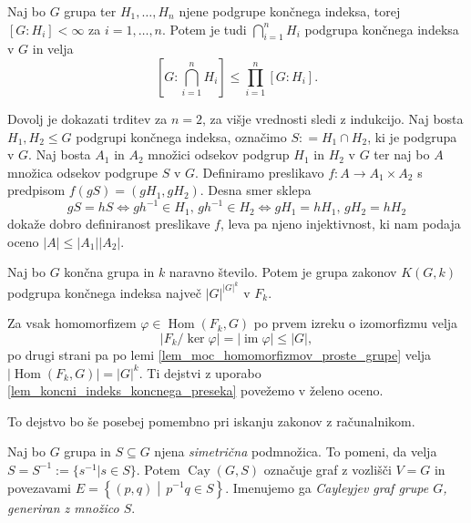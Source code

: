 \begin{lema}\label{lem_koncni_indeks_koncnega_preseka}
Naj bo $G$ grupa ter $H_1, \ldots, H_n$ njene podgrupe končnega indeksa, torej $[G: H_i] < \infty$ za $i = 1, \ldots, n$. Potem je tudi $\bigcap_{i = 1}^{n} H_i$ podgrupa končnega indeksa v $G$ in velja
\begin{equation*}
\left[ G: \bigcap_{i = 1}^{n} H_i \right]  \le \prod_{i=1}^{n} [G: H_i].  
\end{equation*} 
\end{lema}

\begin{dokaz}
Dovolj je dokazati trditev za $n = 2$, za višje vrednosti sledi z indukcijo. Naj bosta $H_1, H_2 \le G$ podgrupi končnega indeksa, označimo $S: = H_1 \cap H_2$, ki je podgrupa v $G$. Naj bosta $A_1$ in $A_2$ množici odsekov podgrup $H_1$ in $H_2$ v $G$ ter naj bo $A$ množica odsekov podgrupe $S$ v $G$.
 Definiramo preslikavo $f \colon A \to  A_1 \times A_2$ s predpisom $f(g S ) = (g H_1, g H_2)$. Desna smer sklepa \begin{equation*}
 g S = h S \iff gh^{-1} \in H_1, \, gh^{-1} \in H_2  \iff g H_1 = h H_1, \, g H_2 = h H_2
\end{equation*}  
dokaže dobro definiranost preslikave $f$, leva pa njeno injektivnost, ki nam podaja oceno $\lvert A \rvert \le  \lvert A_1 \rvert \lvert A_2 \rvert $.    
\end{dokaz}

\begin{posledica}
\label{psl_koncni_indeks_preseka}
Naj bo $G$ končna grupa in $k$ naravno število. Potem je grupa zakonov $K(G, k)$ podgrupa končnega indeksa največ $\lvert G \rvert^{ \lvert G \rvert^k}$ v $F_k$.
\end{posledica}
\begin{dokaz}
  Za vsak homomorfizem $\varphi \in \operatorname{Hom}(F_k, G)$ po prvem izreku o izomorfizmu velja \begin{equation*}
    \lvert F_k / \ker \varphi \rvert = \lvert \operatorname{im} \varphi \rvert \le \lvert G \rvert, 
\end{equation*}
po drugi strani pa po lemi \ref{lem_moc_homomorfizmov_proste_grupe} velja $\lvert \operatorname{Hom}(F_k, G) \rvert = \lvert G \rvert^k$. Ti dejstvi z uporabo \ref{lem_koncni_indeks_koncnega_preseka} povežemo v želeno oceno.
\end{dokaz}
To dejstvo bo še posebej pomembno pri iskanju zakonov z računalnikom.

\begin{definicija}
\label{def_cayleyev_graf}
Naj bo $G$ grupa in $S \subseteq G$ njena \emph{simetrična} podmnožica. To pomeni, da velja $S = S^{-1} := \{ s^{-1}  \vert s \in S  \}$. Potem $\operatorname{Cay}(G, S)$ označuje graf z vozlišči $V = G$ in povezavami
$E = \left\{ (p, q) \middle|\, p^{-1}q \in  S \right\}$. Imenujemo ga \emph{Cayleyjev graf grupe $G$, generiran z množico $S$}.  
\end{definicija}

